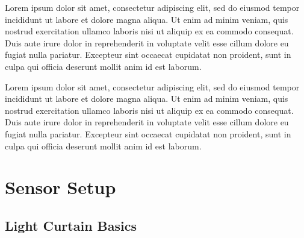 \documentclass[review]{cvpr}
\begin{document}
Lorem ipsum dolor sit amet, consectetur adipiscing elit, sed do eiusmod tempor incididunt ut labore et dolore magna aliqua. Ut enim ad minim veniam, quis nostrud exercitation ullamco laboris nisi ut aliquip ex ea commodo consequat. Duis aute irure dolor in reprehenderit in voluptate velit esse cillum dolore eu fugiat nulla pariatur. Excepteur sint occaecat cupidatat non proident, sunt in culpa qui officia deserunt mollit anim id est laborum. \cite{Ancha_2020_ECCV}

Lorem ipsum dolor sit amet, consectetur adipiscing elit, sed do eiusmod tempor incididunt ut labore et dolore magna aliqua. Ut enim ad minim veniam, quis nostrud exercitation ullamco laboris nisi ut aliquip ex ea commodo consequat. Duis aute irure dolor in reprehenderit in voluptate velit esse cillum dolore eu fugiat nulla pariatur. Excepteur sint occaecat cupidatat non proident, sunt in culpa qui officia deserunt mollit anim id est laborum.


\section{Sensor Setup}

\subsection{Light Curtain Basics}
\end{document}
